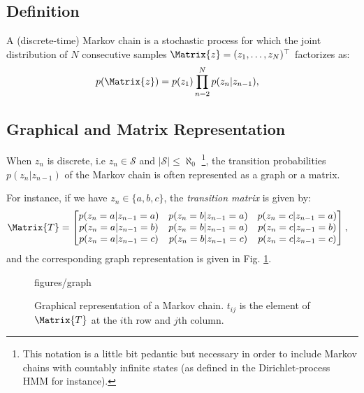 \documentclass[class=article, crop=false]{standalone}
\begin{document}
\subsection{Definition}

A (discrete-time) Markov chain is a stochastic process for which the
joint distribution of $N$ consecutive samples
$\Matrix{z} = (z_1, \dots, z_N)^\top$ factorizes as:
\begin{align}
    p(\Matrix{z}) &= p(z_1)\prod_{n=2}^N p(z_n | z_{n-1}),
\end{align}

\subsection{Graphical and Matrix Representation}

When $z_n$ is discrete, i.e $z_n \in \mathcal{S}$ and
$| \mathcal{S} | \le \aleph_0$ \footnote{
    This notation is a little bit
    pedantic but necessary in order to include Markov chains with
    countably infinite states (as defined in the Dirichlet-process HMM
    for instance).
}, the transition probabilities $p(z_n|z_{n-1})$ of the Markov chain is
often represented as a graph or a matrix.

For instance, if we have $z_n \in \{a, b, c\}$, the \emph{transition matrix}
is given by:
\begin{align}
    \Matrix{T} &= \begin{bmatrix}
        p(z_n = a | z_{n-1} = a)  & p(z_n = b | z_{n-1} = a) & p(z_n = c | z_{n-1} = a) \\
        p(z_n = a | z_{n-1} = b)  & p(z_n = b | z_{n-1} = a) & p(z_n = c | z_{n-1} = b) \\
        p(z_n = a | z_{n-1} = c)  & p(z_n = b | z_{n-1} = c) & p(z_n = c | z_{n-1} = c) \\
    \end{bmatrix},
\end{align}
and the corresponding graph representation is given in Fig. \ref{markovchains:fig:graph}.

\begin{figure}[t]
    \centering
    {figures/graph}
    \caption{Graphical representation of a Markov chain. $t_{ij}$ is the
     element of $\Matrix{T}$ at the $i$th row and $j$th column.}
    \label{markovchains:fig:graph}
\end{figure}
%
\end{document}
